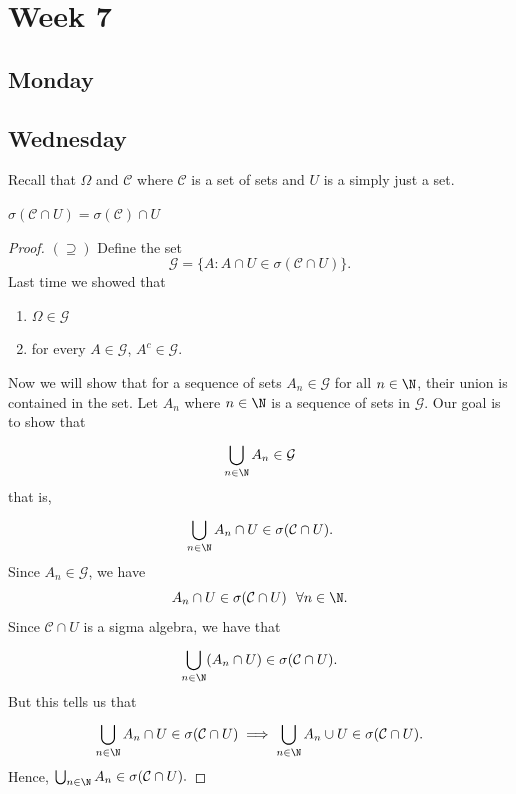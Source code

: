 \section{Week 7}

\subsection{Monday}

\subsection{Wednesday}

Recall that \( \Omega \) and \( \mathcal{C} \) where \( \mathcal{C} \) is a set of sets and \( U  \) is a simply just a set.

\begin{prop}
    \( \sigma(\mathcal{C} \cap U) = \sigma(\mathcal{C}) \cap U \)
\end{prop}
\begin{proof}

\( (\supseteq) \) Define the set 
\[  \mathcal{G} = \{  A : A \cap U \in \sigma(\mathcal{C} \cap U)  \}.  \]
Last time we showed that 
\begin{enumerate}
    \item[(1)] \( \Omega \in \mathcal{G} \)
    \item[(2)] for every \( A \in \mathcal{G} \), \( A^{c} \in \mathcal{G} \).
\end{enumerate}
Now we will show that for a sequence of sets \( {A}_{n} \in \mathcal{G} \) for all \( n \in \N  \), their union is contained in the set.
Let \( {A}_{n} \) where \( n \in \N \) is a sequence of sets in \( \mathcal{G} \). Our goal is to show that  
\[  \bigcup_{ n \in \N  }^{  }  {A}_{n} \in \mathcal{G} \]
that is,
\[  \bigcup_{ n \in \N }^{  }  {A}_{n} \cap U  \in \sigma(\mathcal{C} \cap U). \]
Since \( {A}_{n} \in \mathcal{G} \), we have 
\[  {A}_{n} \cap U  \in \sigma(\mathcal{C} \cap U) \ \ \forall n \in \N. \]
Since \( \mathcal{C} \cap U \) is a sigma algebra, we have that
\[  \bigcup_{ n \in \N }^{   }  ({A}_{n} \cap U  )  \in \sigma(\mathcal{C} \cap U).  \]
But this tells us that 
\[  \bigcup_{ n \in \N }^{  }  {A}_{n} \cap U  \in \sigma(\mathcal{C} \cap U) \implies \bigcup_{ n \in \N  }^{  }  {A}_{n} \cup U  \in \sigma(\mathcal{C} \cap U). \]
Hence, \( \bigcup_{ n \in \N }^{  }  {A}_{n} \in \sigma(\mathcal{C} \cap U). \)
\end{proof}

